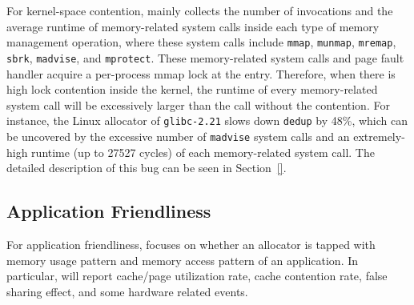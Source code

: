 
For kernel-space contention, \MP{} mainly collects the number of invocations and the average runtime of memory-related system calls inside each type of memory management operation, where these system calls include \texttt{mmap}, \texttt{munmap}, \texttt{mremap}, \texttt{sbrk}, \texttt{madvise}, and \texttt{mprotect}. These memory-related system calls and page fault handler acquire a per-process mmap lock at the entry. Therefore, when there is high lock contention inside the kernel, the runtime of every memory-related system call will be excessively larger than the call without the contention. For instance, the Linux allocator of \texttt{glibc-2.21} slows down \texttt{dedup} by 48\%, which can be uncovered by the excessive number of \texttt{madvise} system calls and an extremely-high runtime (up to 27527 cycles) of each memory-related system call. The detailed description of this bug can be seen in Section~\ref{}.  



\subsection{Application Friendliness}
\label{sec:profilefriendliness}

 
For application friendliness, \MP{} focuses on whether an allocator is tapped with memory usage pattern and memory access pattern of an application.  In particular, \MP{} will report cache/page utilization rate, cache contention rate, false sharing effect, and some hardware related events. 


